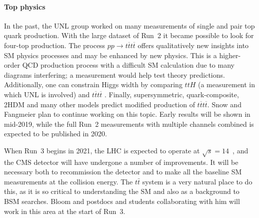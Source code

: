 \paragraph{Top physics}
%

In the past, the UNL group worked on many measurements of single and pair top quark production. With the large dataset of Run~2 it became possible to look for four-top production. The process $pp\to t\overline{t}t\overline{t}$ offers qualitatively new insights into SM physics processes and may be enhanced by new physics. This is a higher-order QCD production process with a difficult SM calculation due to many diagrams interfering; a measurement would help test theory predictions. Additionally, one can constrain Higgs width by comparing $ttH$ (a measurement in which UNL is involved) and $t\overline{t}t\overline{t}$ \cite{bib:Higgs-width-tttt}. Finally, supersymmetric, quark-composite, 2HDM and many other models predict modified production of $t\overline{t}t\overline{t}$. Snow and Fangmeier plan to continue working on this topic. Early results will be shown in mid-2019, while the full Run~2 measurements with multiple channels combined is expected to be published in 2020.

When Run~3 begins in 2021, the LHC is expected to operate at $\sqrt{s} = 14$~\TeV, and the CMS detector will have undergone a number of improvements.  It will be necessary both to recommission the detector and to make all the baseline SM measurements at the collision energy.  The $t\bar{t}$ system is a very natural place to do this, as it is so critical to understanding the SM and also as a background to BSM searches.  Bloom and postdocs and students collaborating with him will work in this area at the start of Run~3.

